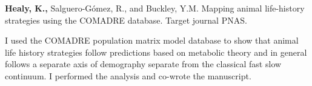 \documentclass[10pt,a4paper]{article}
\begin{document}
\begin{flushleft}
\setlength{\parindent}{0mm}\textbf{Healy, K.,} Salguero-Gómez, R., and Buckley, Y.M. Mapping animal life-history strategies using the COMADRE database. Target journal PNAS.
\smallskip
\par{\fontsize{10.5}{10} I used the COMADRE population matrix model database to show that animal life history strategies follow predictions based on metabolic theory and in general follows a separate axis of demography separate from the classical fast slow continuum. I performed the analysis and co-wrote the manuscript.}

\bigskip

\end{flushleft}









\end{document}
